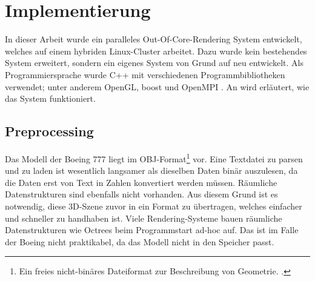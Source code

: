 
\chapter{Implementierung}
\label{chap:impl}
%
%
%
%

In dieser Arbeit wurde ein paralleles Out-Of-Core-Rendering System entwickelt, welches auf einem hybriden Linux-Cluster arbeitet. Dazu wurde kein bestehendes System erweitert, sondern ein eigenes System von Grund auf neu entwickelt. Als Programmiersprache wurde C++ mit verschiedenen Programmbibliotheken verwendet; unter anderem OpenGL, boost und OpenMPI \cite{mpi}. An wird erläutert, wie das System funktioniert.\\

\section{Preprocessing}
\label{sec:impl:preprocessing}
Das Modell der Boeing 777 liegt im OBJ-Format\footnote{Ein freies nicht-binäres Dateiformat zur Beschreibung von Geometrie. \cite{obj}. } vor. Eine Textdatei zu parsen und zu laden ist wesentlich langsamer als dieselben Daten binär auszulesen, da die Daten erst von Text in Zahlen konvertiert werden müssen. Räumliche Datenstrukturen sind ebenfalls nicht vorhanden. Aus diesem Grund ist es notwendig, diese 3D-Szene zuvor in ein Format zu übertragen, welches einfacher und schneller zu handhaben ist. Viele Rendering-Systeme bauen räumliche Datenstrukturen wie Octrees beim Programmstart ad-hoc auf. Das ist im Falle der Boeing nicht praktikabel, da das Modell nicht in den Speicher passt.

